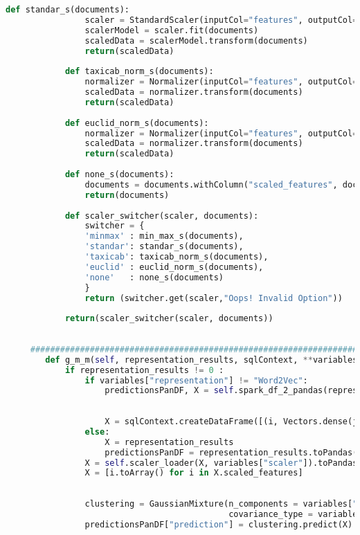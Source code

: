 \documentclass[12pt]{article}
\begin{document}
\begin{lstlisting}[language=Python, caption = Clase Clusters]
	        def standar_s(documents):
	            scaler = StandardScaler(inputCol="features", outputCol="scaled_features", withStd=True, withMean=False)
	            scalerModel = scaler.fit(documents)
	            scaledData = scalerModel.transform(documents)
	            return(scaledData)
	        
	        def taxicab_norm_s(documents):
	            normalizer = Normalizer(inputCol="features", outputCol="scaled_features", p=1.0)
	            scaledData = normalizer.transform(documents)
	            return(scaledData)
	            
	        def euclid_norm_s(documents):
	            normalizer = Normalizer(inputCol="features", outputCol="scaled_features", p=2.0)
	            scaledData = normalizer.transform(documents)
	            return(scaledData)
	        
	        def none_s(documents):
	            documents = documents.withColumn("scaled_features", documents["features"])
	            return(documents)
	        
	        def scaler_switcher(scaler, documents):
	            switcher = {
	            'minmax' : min_max_s(documents),
	            'standar': standar_s(documents),
	            'taxicab': taxicab_norm_s(documents),
	            'euclid' : euclid_norm_s(documents),
	            'none'   : none_s(documents)
	            }
	            return (switcher.get(scaler,"Oops! Invalid Option"))
	        
	        return(scaler_switcher(scaler, documents))
	    
	        
	 ##############################################################################   
	    def g_m_m(self, representation_results, sqlContext, **variables):
	        if representation_results != 0 :
	            if variables["representation"] != "Word2Vec":
	                predictionsPanDF, X = self.spark_df_2_pandas(representation_results)
	                
	                
	                X = sqlContext.createDataFrame([(i, Vectors.dense(j),) for i,j in enumerate(X)], ["id", "features"])
	            else:
	                X = representation_results
	                predictionsPanDF = representation_results.toPandas()
	            X = self.scaler_loader(X, variables["scaler"]).toPandas()
	            X = [i.toArray() for i in X.scaled_features]
	                
	                                
	            clustering = GaussianMixture(n_components = variables["numb_clusters"],
	                                         covariance_type = variables["cov_type"]).fit(X)
	            predictionsPanDF["prediction"] = clustering.predict(X)
	            

\end{lstlisting}
\end{document}
